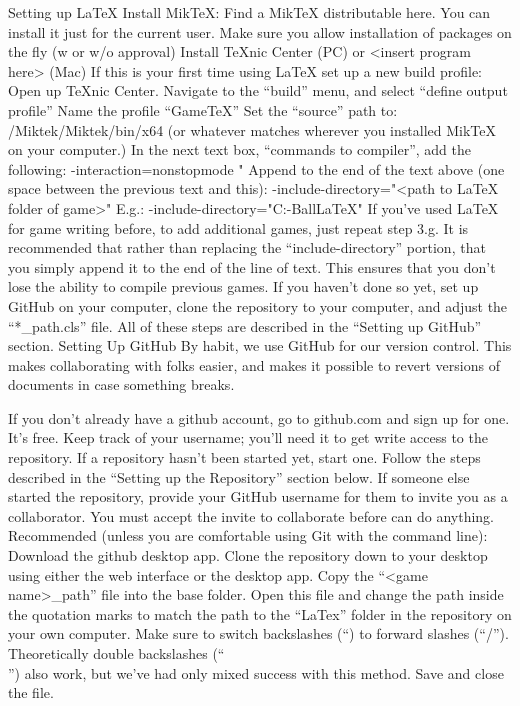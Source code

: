 

Setting up LaTeX
Install MikTeX:
Find a MikTeX distributable here.
You can install it just for the current user.
Make sure you allow installation of packages on the fly (w or w/o approval)
Install TeXnic Center (PC) or <insert program here> (Mac)
If this is your first time using LaTeX set up a new build profile:
Open up TeXnic Center.
Navigate to the “build” menu, and select “define output profile”
Name the profile “GameTeX”
Set the “source” path to: /Miktek/Miktek/bin/x64 (or whatever matches wherever you installed MikTeX on your computer.)
In the next text box, “commands to compiler”, add the following: -interaction=nonstopmode "%
Append to the end of the text above (one space between the previous text and this):
-include-directory="<path to LaTeX folder of game>" 
E.g.: -include-directory="C:\Users\silve\Documents\GitHub\Neptune-Ball\LaTeX"
If you’ve used LaTeX for game writing before, to add additional games, just repeat step 3.g. It is recommended that rather than replacing the “include-directory” portion, that you simply append it to the end of the line of text. This ensures that you don’t lose the ability to compile previous games.
If you haven’t done so yet, set up GitHub on your computer, clone the repository to your computer, and adjust the “*_path.cls” file. All of these steps are described in the “Setting up GitHub” section.
Setting Up GitHub
By habit, we use GitHub for our version control. This makes collaborating with folks easier, and makes it possible to revert versions of documents in case something breaks.

If you don’t already have a github account, go to github.com and sign up for one. It’s free. Keep track of your username; you’ll need it to get write access to the repository.
If a repository hasn’t been started yet, start one. Follow the steps described in the “Setting up the Repository” section below.
If someone else started the repository, provide your GitHub username for them to invite you as a collaborator. You must accept the invite to collaborate before can do anything.
Recommended (unless you are comfortable using Git with the command line): Download the github desktop app.
Clone the repository down to your desktop using either the web interface or the desktop app.
Copy the “<game name>_path” file into the base folder. Open this file and change the path inside the quotation marks to match the path to the “LaTex” folder in the repository on your own computer. Make sure to switch backslashes (“\”) to forward slashes (“/”). Theoretically double backslashes (“\\”) also work, but we’ve had only mixed success with this method. Save and close the file.


